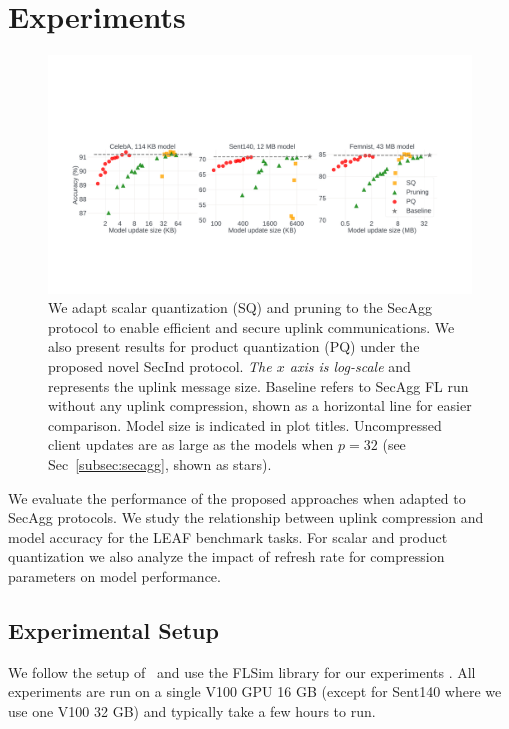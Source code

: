 \documentclass[11pt]{article}
\newcommand{\SecInd}{{\sc SecInd}\xspace}
\newcommand{\SecAgg}{{\sc SecAgg}\xspace}
\newcommand{\pierre}[1]{{\color{purple}Pierre: #1}}
\newcommand{\modif}[1]{{\color{black}#1}}
\begin{document}
\section{Experiments}
\label{sec:experiments}

\begin{figure}[t]
    \centering
    \includegraphics[width=\textwidth]{submissions/GrahamCormode/figs/results_summary.pdf}
    \vspace{-5mm}
    \caption{\label{fig:results_summary}
    We adapt scalar quantization (SQ) and pruning to the \SecAgg protocol to enable efficient and secure uplink communications. We also present results for product quantization (PQ) under the proposed novel \SecInd protocol. \modif{\emph{The $x$ axis is log-scale} and represents the uplink message size}. Baseline refers to \SecAgg FL run without any uplink compression, shown as a horizontal line for easier comparison. Model size is indicated in plot titles. Uncompressed client updates are as large as the models when $p=32$ (see Sec~\ref{subsec:secagg}, shown as stars).
    }
\end{figure}

We evaluate the performance of the proposed approaches when adapted to \SecAgg protocols.
We study the relationship between uplink compression and model accuracy for the LEAF benchmark tasks.
For scalar and product quantization we also analyze the impact of refresh rate for compression parameters on  model performance.

\subsection{Experimental Setup}
\label{subsec:setup}
We follow the setup of~\cite{Graham-nguyen2021federated} and use the {FLSim library}
for our experiments
.
All experiments are run on a single V100 GPU 16 GB (except for Sent140 where we use one V100 32 GB) and typically take a few hours to run.
\end{document}
